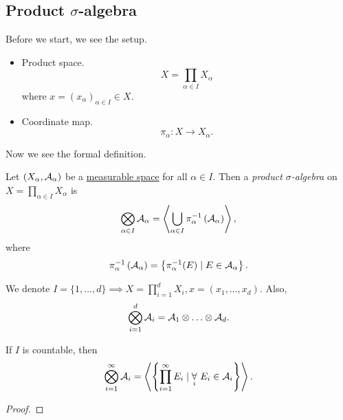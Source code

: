 \subsection{Product \(\sigma\)-algebra}
Before we start, we see the setup.
\begin{itemize}
	\item Product space.
	      \[
		      X = \prod\limits_{\alpha \in I} X_\alpha
	      \]
	      where \(x = (x_\alpha )_{\alpha \in I}\in X\).
	\item Coordinate map.
	      \[
		      \pi _\alpha \colon X\to X_\alpha.
	      \]
\end{itemize}

Now we see the formal definition.
\begin{definition}\label{def:product-sigma-algebra}
	Let \((X_\alpha , \mathcal{\MakeUppercase{a}} _\alpha )\) be a \hyperref[def:measurable-space]{measurable space} for all \(\alpha \in I\).
	Then a \emph{product \(\sigma\)-algebra} on \(X = \prod\limits_{\alpha \in I} X_\alpha \) is
	\[
		\bigotimes_{\alpha \in I}\mathcal{\MakeUppercase{a}} _\alpha = \left< \bigcup\limits_{\alpha \in I} \pi ^{-1} _{\alpha }\left(\mathcal{\MakeUppercase{a}} _\alpha \right)  \right>,
	\]
	where
	\[
		\pi ^{-1} _\alpha \left(\mathcal{\MakeUppercase{a}} _\alpha \right) = \left\{\pi ^{-1} _\alpha (E) \mid E\in \mathcal{\MakeUppercase{a}} _\alpha \right\}.
	\]
\end{definition}

\begin{notation}
	We denote \(I = \{1, \ldots , d\} \implies X = \prod\limits_{i=1}^{d} X_{i}, x = (x_1, \ldots , x_d )\). Also,
	\[
		\bigotimes_{i = 1}^d \mathcal{\MakeUppercase{a}} _{i} = \mathcal{\MakeUppercase{a}} _1\otimes \ldots \otimes \mathcal{\MakeUppercase{a}} _d.
	\]
\end{notation}

\begin{lemma}
	If \(I\) is countable, then
	\[
		\bigotimes_{i = 1}^{\infty}\mathcal{\MakeUppercase{a}} _{i} = \left< \left\{\prod\limits_{i = 1}^{\infty} E_{i} \mid \underset{i}{\forall }\ E_{i}\in \mathcal{\MakeUppercase{a}} _{i}\right\} \right>.
	\]
\end{lemma}
\begin{proof}
\end{proof}